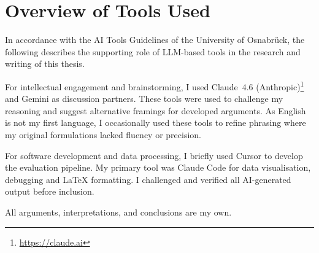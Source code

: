 \documentclass[11pt,
  paper=a4,
  bibliography=totocnumbered,
  captions=tableheading,
  BCOR=10mm
]{scrreprt}
\begin{document}
\chapter*{Overview of Tools Used}

In accordance with the AI Tools Guidelines of the University of
Osnabr\"uck, the following describes the supporting role of LLM-based
tools in the research and writing of this thesis.

For intellectual engagement and brainstorming, I used Claude~4.6
(Anthropic)\footnote{\url{https://claude.ai}} and Gemini as discussion
partners. These tools were used to challenge my reasoning and suggest
alternative framings for developed arguments. As English is not my first
language, I occasionally used these tools to refine phrasing where my
original formulations lacked fluency or precision.

For software development and data processing, I briefly used Cursor to
develop the evaluation pipeline. My primary tool was Claude Code for data
visualisation, debugging and \LaTeX{} formatting. I challenged and
verified all AI-generated output before inclusion.

\noindent All arguments, interpretations, and conclusions are my own.


\glsaddall
\printglossaries
\printbibliography


\appendix

\end{document}
